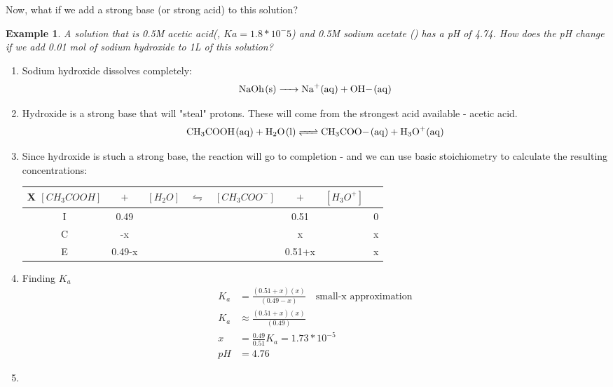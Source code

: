 \documentclass[../CHEM152Notes.tex]{subfiles}
\newtheorem{exmp}{Example}
\begin{document}
Now, what if we add a strong base (or strong acid) to this solution?
\begin{exmp}
    A solution that is 0.5M acetic acid(, $Ka = 1.8*10^-5$) and 0.5M sodium acetate () has a pH of 4.74. How does the pH change if we add 0.01 mol of sodium hydroxide to 1L of this solution?
\end{exmp}
\begin{enumerate}
    \item Sodium hydroxide dissolves completely:
    \begin{equation*}
        \begin{aligned}
            \ce{NaOh_(s) -> Na+_(aq) + OH-_(aq)}
        \end{aligned}
    \end{equation*}
    
    \item Hydroxide is a strong base that will "steal" protons. These will come from the strongest acid available - acetic acid.
    \begin{equation*}
        \begin{aligned}
            \ce{CH3COOH_(aq) + H2O_(l) <=> CH3COO-_(aq) + H3O+_(aq)}
        \end{aligned}
    \end{equation*}
    \item Since hydroxide is stuch a strong base, the reaction will go to completion - and we can use basic stoichiometry to calculate the resulting concentrations:
    \begin{tabular}{c|c@{}c@{}c@{}c@{}c@{}c@{}c}
        \hline
        X   $[CH_3COOH]$ & ${}+{}$ & $[H_2O]$ & ${}\leftrightharpoons{}$ & $[CH_3COO^-]$ & ${}+{}$ & $[H_3O^+]$ \\
        \hline
        I   &  0.49     &&     &&  0.51   && 0  \\
        C   &  -x       &&     &&  x   && x  \\
        E   &  0.49-x   &&     &&  0.51+x   &&  x \\      
    \end{tabular}
    \item Finding $K_a$
    \begin{equation*}
        \begin{aligned}
            K_a &= \frac{(0.51+x)(x)}{(0.49-x)} \quad \text{small-x approximation} \\
            K_a &\approx \frac{(0.51+x)(x)}{(0.49)} \\
            x &= \frac{0.49}{0.51}K_a = 1.73*10^{-5} \\
            pH &= 4.76
        \end{aligned}
    \end{equation*}
    \item 
\end{enumerate}
\end{document}
